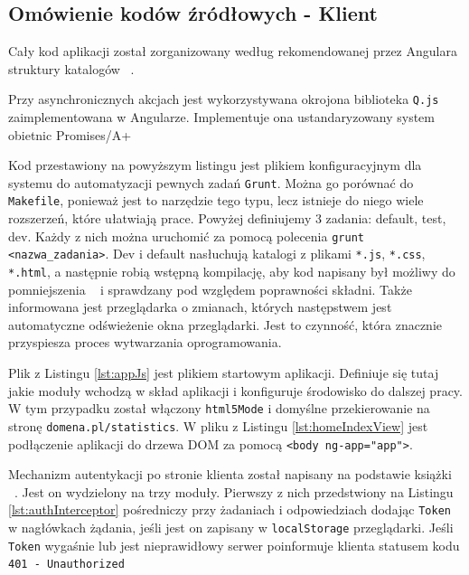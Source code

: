 \documentclass[10pt,titlepage]{article}
\begin{document}
\subsection{Omówienie kodów źródłowych - Klient}
\lstset{language=JavaScript}
\par Cały kod aplikacji został zorganizowany według rekomendowanej przez Angulara struktury katalogów ~\cite{angular:structure}.
\par Przy asynchronicznych akcjach jest wykorzystywana okrojona biblioteka \verb|Q.js| ~\cite{lib:q} zaimplementowana w Angularze. Implementuje ona ustandaryzowany system obietnic Promises/A+ ~\cite{doc:promises}

\par Kod przestawiony na powyższym listingu jest plikiem konfiguracyjnym dla systemu do automatyzacji pewnych zadań \verb|Grunt|. Można go porównać do \verb|Makefile|, ponieważ jest to narzędzie tego typu, lecz istnieje do niego wiele rozszerzeń, które ułatwiają prace. Powyżej definiujemy 3 zadania: default, test, dev. Każdy z nich można uruchomić za pomocą polecenia \verb|grunt <nazwa_zadania>|. Dev i default nasłuchują katalogi z plikami \verb|*.js|, \verb|*.css|, \verb|*.html|, a następnie robią wstępną kompilację, aby kod napisany był możliwy do pomniejszenia ~\cite{angular:minSafe} i sprawdzany pod względem poprawności składni. Także informowana jest przeglądarka o zmianach, których następstwem jest automatyczne odświeżenie okna przeglądarki. Jest to czynność, która znacznie przyspiesza proces wytwarzania oprogramowania.
\par Plik z Listingu \ref{lst:appJs} jest plikiem startowym aplikacji. Definiuje się tutaj jakie moduły wchodzą w skład aplikacji i konfiguruje środowisko do dalszej pracy. W tym przypadku został włączony \verb|html5Mode| i domyślne przekierowanie na stronę \verb|domena.pl/statistics|. W pliku z Listingu \ref{lst:homeIndexView} jest podłączenie aplikacji do drzewa DOM za pomocą \verb|<body ng-app="app">|.

Mechanizm autentykacji po stronie klienta został napisany na podstawie książki ~\cite{angular:bookMastering}. Jest on wydzielony na trzy moduły. Pierwszy z nich przedstwiony na Listingu \ref{lst:authInterceptor} pośredniczy przy żadaniach i odpowiedziach dodając \verb|Token| w nagłówkach żądania, jeśli jest on zapisany w \verb|localStorage| przeglądarki. Jeśli \verb|Token| wygaśnie lub jest nieprawidłowy serwer poinformuje klienta statusem kodu \verb|401 - Unauthorized| ~\cite{http:statuscodes}
\end{document}
